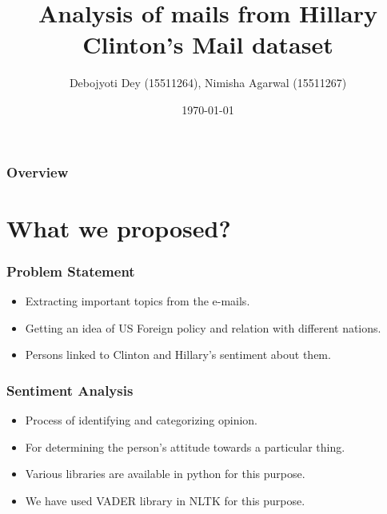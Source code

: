 \documentclass{beamer}
\title[Short title]{Analysis of mails from Hillary Clinton’s Mail dataset} %
\author{Debojyoti Dey (15511264), Nimisha Agarwal (15511267)} %
\date{\today} %
\begin{document}
	
\begin{frame}
	\titlepage %
\end{frame}

\begin{frame}
	\frametitle{Overview} %
	\tableofcontents %
\end{frame}


\section{What we proposed?}


\begin{frame}
	\frametitle{Problem Statement}
	\begin{itemize}
		\item Extracting important topics from the e-mails.
		\item Getting an idea of US Foreign policy and relation with different nations.
		\item Persons linked to Clinton and Hillary's sentiment about them.
	\end{itemize}
\end{frame}


\begin{frame}
	\frametitle{Sentiment Analysis}
	\begin{itemize}
		\item Process of identifying and categorizing opinion.
		\item For determining the person's attitude towards a particular thing.
		\item Various libraries are available in python for this purpose.
		\item We have used VADER library in NLTK for this purpose.
	\end{itemize}
\end{frame}
\end{document}
